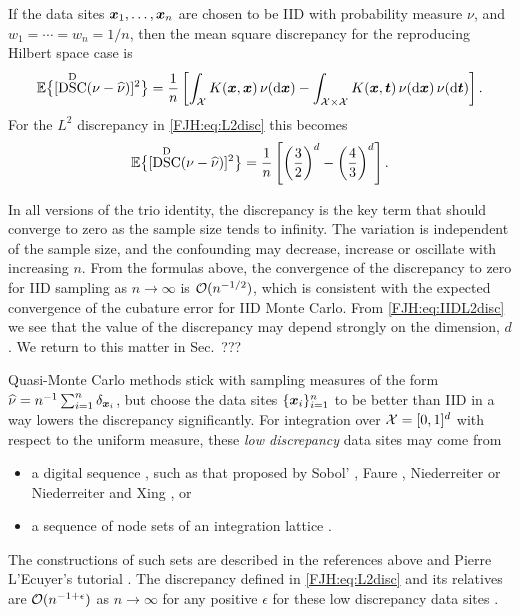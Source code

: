 \documentclass[graybox,footinfo]{svmult}
\DeclareMathOperator{\disc}{DSC}
\begin{document}
If the data sites  ${\boldsymbol{x}}_{1}, \ldots, {\boldsymbol{x}}_{n}$ are chosen to be IID with probability measure 
$\nu$, and $w_1 = \cdots = w_n = 1/n$, then 
the mean square discrepancy for 
the reproducing Hilbert space case is
\begin{equation*}
\bbE \bigl\{[\disc^{\Dt}(\nu - \hnu)]^2 \bigr \}  = \frac 1 n \left [ \int_{\cx} K(\bsx,\bsx) \, 
\nu(\D 
\bsx) - 
\int_{\cx \times \cx} K(\bsx,\bst) \, \nu(\D \bsx) \, \nu (\D \bst) \right ].
\end{equation*}
For the $L^2$ discrepancy in \eqref{FJH:eq:L2disc} this becomes 
\begin{equation} \label{FJH:eq:IIDL2disc}
\bbE \bigl\{[\disc^{\Dt}(\nu - \hnu)]^2 \bigr \} = \frac 1 n \left [ \left(\frac 32\right)^d - 
\left(\frac 43\right)^d \right ].
\end{equation}

In all versions of the trio identity, the discrepancy is the key term that should converge to 
zero as the sample size tends to infinity.  The variation is independent of the sample 
size, and the confounding may decrease, increase or oscillate with increasing $n$.  From 
the formulas above, the convergence of the discrepancy to zero for IID sampling as $n 
\to 
\infty$ is  $\mathcal{O}(n^{-1/2})$, which is consistent with the expected convergence of the 
cubature error for IID Monte Carlo.  From \eqref{FJH:eq:IIDL2disc} we see that the 
value of the discrepancy may depend strongly on the dimension, $d$.  We return 
to this matter in Sec.\ ???

Quasi-Monte Carlo methods stick with sampling measures of the form  $\widehat{\nu} = 
n^{-1}\sum_{i=1}^n \delta_{{\boldsymbol{x}}_i}$, but choose the data sites $\{{\boldsymbol{x}}_i\}_{i=1}^n$ to be 
better than IID in a way lowers the discrepancy significantly.  For 
integration over $\mathcal{X} = [0,1]^d$ with 
respect to the uniform measure, these \emph{low discrepancy} data sites may come from
\begin{itemize} 
\item a digital sequence \cite{DicPil10a}, such as that proposed by Sobol' \cite{}, Faure 
\cite{}, 
Niederreiter \cite{} or Niederreiter and Xing \cite{}, or 
\item a sequence of node sets of an integration lattice \cite{SloJoe94}.  
\end{itemize}
The 
constructions of such sets are described in the references above and Pierre L'Ecuyer's 
tutorial 
\cite{}.  The discrepancy defined in \eqref{FJH:eq:L2disc} and its relatives are 
$\mathcal{O}(n^{-1+\epsilon})$ as $n \to \infty$ for any positive $\epsilon$ for these low 
discrepancy data sites \cite{bibid}.  
\end{document}
